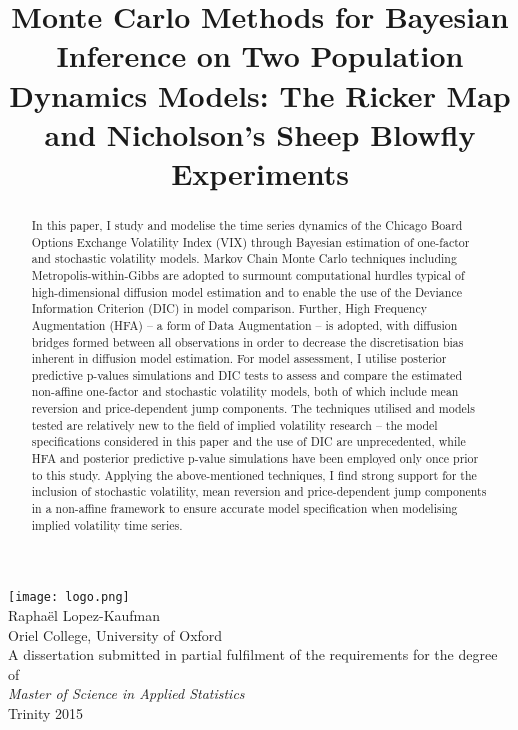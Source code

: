 \documentclass{article}
\title{Monte Carlo Methods for Bayesian Inference on Two Population
	Dynamics Models: The Ricker Map and Nicholson's Sheep Blowfly Experiments}
\date{}
\begin{document}
	\maketitle 
	\thispagestyle{empty}
	\begin{center}
		\vspace{-5mm}
		\texttt{[image: logo.png]} \\
		\vspace{20mm}
		{\large Raphaël Lopez-Kaufman} \\
		\vspace{2mm}
		{\large Oriel College, University of Oxford} \\
		\vspace{40mm}
		A dissertation submitted in partial fulfilment of the requirements for the degree of \\
		\vspace{1mm}
		\textit{Master of Science in Applied Statistics} \\
		\vspace{1mm}
		Trinity 2015
	\end{center}
	
	\vspace{25 mm}
	
	\begin{abstract}
		In this paper, I study and modelise the time series dynamics of the Chicago Board Options Exchange Volatility Index (VIX) through Bayesian estimation of one-factor and stochastic volatility models. Markov Chain Monte Carlo techniques including Metropolis-within-Gibbs are adopted to surmount computational hurdles typical of high-dimensional diffusion model estimation and to enable the use of the Deviance Information Criterion (DIC) in model comparison. Further, High Frequency Augmentation (HFA) -- a form of Data Augmentation -- is adopted, with diffusion bridges formed between all observations in order to decrease the discretisation bias inherent in diffusion model estimation. For model assessment, I utilise posterior predictive p-values simulations and DIC tests to assess and compare the estimated non-affine one-factor and stochastic volatility models, both of which include mean reversion and price-dependent jump components. The techniques utilised and models tested are relatively new to the field of implied volatility research -- the model specifications considered in this paper and the use of DIC are unprecedented, while HFA and posterior predictive p-value simulations have been employed only once prior to this study. Applying the above-mentioned techniques, I find strong support for the inclusion of stochastic volatility, mean reversion and price-dependent jump components in a non-affine framework to ensure accurate model specification when modelising implied volatility time series.
	\end{abstract}
	
\end{document}
